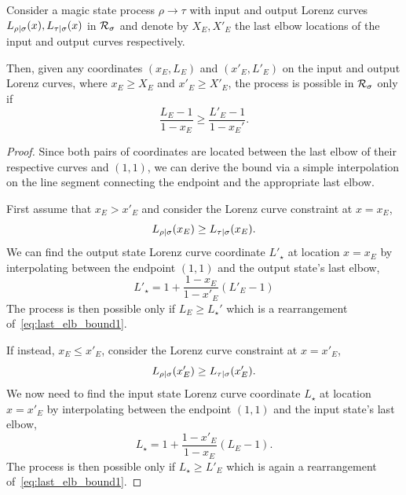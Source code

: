 \begin{proposition}\label{prop:last_elb}
	Consider a magic state process $\rho \longrightarrow \tau$ with input and output Lorenz curves ${L_{\rho|\sigma}}(x), {L_{\tau|\sigma}}(x)$ in ${\mathcal R}_\sigma$ and denote by $X_E, X'_E$ the last elbow locations of the input and output curves respectively.
	
	Then, given any coordinates $(x_E, L_E)$ and $(x'_E, L'_E)$ on the input and output Lorenz curves, where $x_E \geq X_E$ and $x'_E \geq X'_E$, the process is possible in ${\mathcal R}_\sigma$ only if
\begin{equation}\label{eq:last_elb_bound1}
	\frac{L_E - 1}{1-x_E} \geq \frac{L'_E - 1}{1-x_E'}.
\end{equation}
\end{proposition}
\begin{proof}
Since both pairs of coordinates are located between the last elbow of their respective curves and $(1,1)$, we can derive the bound via a simple interpolation on the line segment connecting the endpoint and the appropriate last elbow.

First assume that $x_E > x'_E$ and consider the Lorenz curve constraint at $x = x_E$,
\begin{equation}
	{L_{\rho|\sigma}}(x_E) \geq {L_{\tau|\sigma}}(x_E).
\end{equation} 
We can find the output state Lorenz curve coordinate $L'_\star$ at location $x = x_E$ by interpolating between the endpoint $(1,1)$ and the output state's last elbow, 
\begin{equation}
	L'_\star = 1 + \frac{1-x_E}{1-x'_E} (L'_E - 1)
\end{equation}
The process is then possible only if $L_E \geq L_\star'$ which is a rearrangement of~\cref{eq:last_elb_bound1}.

If instead, $x_E \leq x'_E$, consider the Lorenz curve constraint at $x = x'_E$,
\begin{equation}
	{L_{\rho|\sigma}}(x'_E) \geq {L_{\tau|\sigma}}(x'_E).
\end{equation} 
We now need to find the input state Lorenz curve coordinate $L_\star$ at location $x = x'_E$ by interpolating between the endpoint $(1,1)$ and the input state's last elbow, 
\begin{equation}
	L_\star = 1 + \frac{1-x'_E}{1-x_E} (L_E - 1).
\end{equation}
The process is then possible only if $L_\star \geq L'_E$ which is again a rearrangement of~\cref{eq:last_elb_bound1}.
\end{proof}

